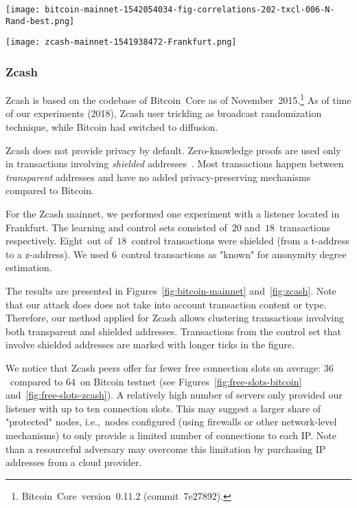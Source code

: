 \begin{figure*}
	\centering
	\begin{minipage}{0.5\textwidth}
		\centering
		\texttt{[image: bitcoin-mainnet-1542054034-fig-correlations-202-txcl-006-N-Rand-best.png]}
		\caption{Transaction clustering for Bitcoin mainnet.}
		\label{fig:bitcoin-mainnet}
	\end{minipage}\hfill
	\begin{minipage}{0.5\textwidth}
		\centering
		\texttt{[image: zcash-mainnet-1541938472-Frankfurt.png]}
		\caption{Transaction clustering for Zcash.}
		\label{fig:zcash}
	\end{minipage}\hfill
\end{figure*}

\subsubsection{Zcash}

Zcash is based on the codebase of Bitcoin~Core as of November~2015.\footnote{Bitcoin~Core~version~0.11.2 (commit~7e27892).}
As of time of our experiments (2018), Zcash user trickling as broadcast randomization technique, while Bitcoin had switched to diffusion.

Zcash does not provide privacy by default.
Zero-knowledge proofs are used only in transactions involving \textit{shielded} addresses~\cite{Kappos2018}.
Most transactions happen between \textit{transparent} addresses and have no added privacy-preserving mechanisms compared to Bitcoin.

For the Zcash mainnet, we performed one experiment with a listener located in Frankfurt.
The learning and control sets consisted of~$20$ and~$18$~transactions respectively.
Eight~out of~$18$~control transactions were shielded (from a t-address to a z-address).
We used $6$~control transactions as "known" for anonymity degree estimation.

The results are presented in Figures~\ref{fig:bitcoin-mainnet} and~\ref{fig:zcash}.
Note that our attack does does not take into account transaction content or type.
Therefore, our method applied for Zcash allows clustering transactions involving both transparent and shielded addresses.
Transactions from the control set that involve shielded addresses are marked with longer ticks in the figure.

We notice that Zcash peers offer far fewer free connection slots on average: $36$~compared to $64$~on Bitcoin testnet (see Figures~\ref{fig:free-slots-bitcoin} and~\ref{fig:free-slots-zcash}).
A relatively high number of servers only provided our listener with up to ten connection slots.
This may suggest a larger share of "protected" nodes, i.e.,~nodes configured (using firewalls or other network-level mechanisms) to only provide a limited number of connections to each IP\@.
Note than a resourceful adversary may overcome this limitation by purchasing IP addresses from a cloud provider.

